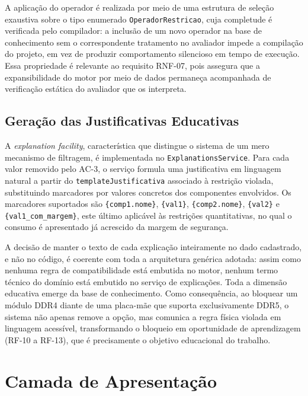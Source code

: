 A aplicação do operador é realizada por meio de uma estrutura de seleção exaustiva sobre o
tipo enumerado \texttt{OperadorRestricao}, cuja completude é verificada pelo compilador: a
inclusão de um novo operador na base de conhecimento sem o correspondente tratamento no
avaliador impede a compilação do projeto, em vez de produzir comportamento silencioso em
tempo de execução. Essa propriedade é relevante ao requisito RNF-07, pois assegura que a
expansibilidade do motor por meio de dados permaneça acompanhada de verificação estática do
avaliador que os interpreta.

\subsection{Geração das Justificativas Educativas}
\label{sub:impl-explicacoes}
A \textit{explanation facility}, característica que distingue o sistema de um mero mecanismo de filtragem, é implementada no \texttt{ExplanationsService}. Para cada valor removido pelo AC-3, o serviço formula uma justificativa em linguagem natural a partir do \texttt{templateJustificativa} associado à restrição violada, substituindo marcadores por valores concretos dos componentes envolvidos. Os marcadores suportados são \texttt{\{comp1.nome\}}, \texttt{\{val1\}}, \texttt{\{comp2.nome\}}, \texttt{\{val2\}} e \texttt{\{val1\_com\_margem\}}, este último aplicável às restrições quantitativas, no qual o consumo é apresentado já acrescido da margem de segurança.

A decisão de manter o texto de cada explicação inteiramente no dado cadastrado, e não no código, é coerente com toda a arquitetura genérica adotada: assim como nenhuma regra de compatibilidade está embutida no motor, nenhum termo técnico do domínio está embutido no serviço de explicações. Toda a dimensão educativa emerge da base de conhecimento. Como consequência, ao bloquear um módulo DDR4 diante de uma placa-mãe que suporta exclusivamente DDR5, o sistema não apenas remove a opção, mas comunica a regra física violada em linguagem acessível, transformando o bloqueio em oportunidade de aprendizagem (RF-10 a RF-13), que é precisamente o objetivo educacional do trabalho.

\section{Camada de Apresentação}
\label{sec:impl-apresentacao}

